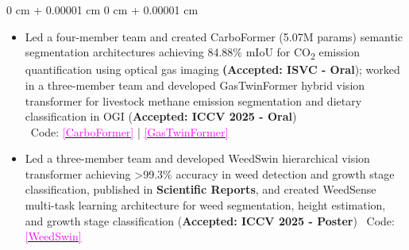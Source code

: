 \documentclass[10pt, letterpaper]{article}
\newenvironment{highlights}{
    \begin{itemize}[
        topsep=0.10 cm,
        parsep=0.10 cm,
        partopsep=0pt,
        itemsep=0pt,
        leftmargin=0 cm + 10pt
    ]
}{
    \end{itemize}
} %
\newenvironment{onecolentry}{
    \begin{adjustwidth}{
        0 cm + 0.00001 cm
    }{
        0 cm + 0.00001 cm
    }
}{
    \end{adjustwidth}
} %
\begin{document}
        \vspace{0.10 cm}
        \begin{onecolentry}


\begin{highlights}
    \item Led a four-member team and created CarboFormer (5.07M params) semantic segmentation architectures achieving 84.88\% mIoU for CO\textsubscript{2} emission quantification using optical gas imaging  \textbf{(Accepted: ISVC - Oral}); worked in a three-member team and developed GasTwinFormer hybrid vision transformer for livestock methane emission segmentation and dietary classification in OGI (\textbf{Accepted: ICCV 2025 - Oral}) 
    \\{\small \faGithub\ Code: \href{https://github.com/taminulislam/carbonext-carboformer}{\textcolor{magenta}{[CarboFormer]}} | \href{https://github.com/toqitahamid/controlled-diet-methane-dataset-tools}{\textcolor{magenta}{[GasTwinFormer]}}}
    
    \item Led a three-member team and developed WeedSwin hierarchical vision transformer achieving >99.3\% accuracy in weed detection and growth stage classification, published in \textbf{Scientific Reports}, and created WeedSense multi-task learning architecture for weed segmentation, height estimation, and growth stage classification (\textbf{Accepted: ICCV 2025 - Poster}) {\small \faGithub\ Code: \href{https://github.com/taminulislam/weedswin}{\textcolor{magenta}{[WeedSwin]}}}
    
\end{highlights}

        \end{onecolentry}
\end{document}

